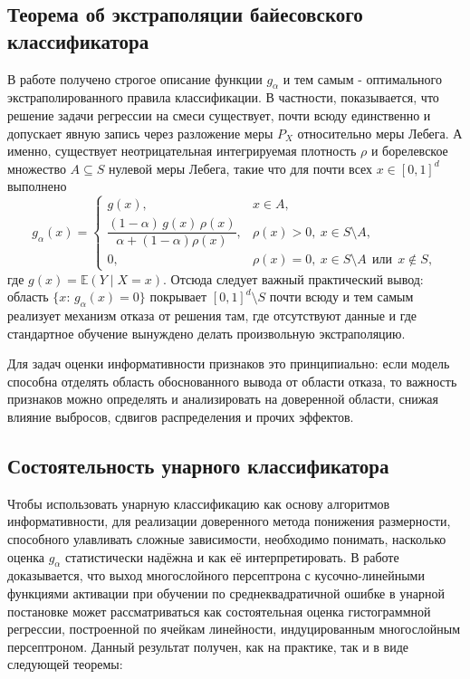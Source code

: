 \documentclass[12pt,a4paper]{article}
\begin{document}
\subsection{Теорема об экстраполяции байесовского классификатора}

В работе \cite{unar} получено строгое описание функции $g_\alpha$ и тем самым - оптимального
экстраполированного правила классификации. В частности, показывается, что решение задачи
регрессии на смеси существует, почти всюду единственно и допускает явную запись через
разложение меры $P_X$ относительно меры Лебега.
А именно, существует неотрицательная интегрируемая плотность $\rho$ и борелевское множество
$A\subseteq S$ нулевой меры Лебега, такие что для почти всех $x\in[0,1]^d$ выполнено
\begin{equation}
g_\alpha(x)=
\begin{cases}
g(x), & x\in A,\\[2mm]
\dfrac{(1-\alpha)\,g(x)\,\rho(x)}{\alpha+(1-\alpha)\rho(x)}, & \rho(x)>0,\ x\in S\setminus A,\\[3mm]
0, & \rho(x)=0,\ x\in S\setminus A\ \ \text{или}\ \ x\notin S,
\end{cases}
\end{equation}
где $g(x)=\mathbb{E}(Y\mid X=x)$.
Отсюда следует важный практический вывод: область $\{x:\,g_\alpha(x)=0\}$ покрывает
$[0,1]^d\setminus S$ почти всюду и тем самым реализует механизм отказа от решения там,
где отсутствуют данные и где стандартное обучение вынуждено делать
произвольную экстраполяцию.

Для задач оценки информативности признаков это принципиально: если модель способна
отделять область обоснованного вывода от области отказа, то важность признаков можно
определять и анализировать на доверенной области, снижая влияние выбросов,
сдвигов распределения и прочих эффектов.

\subsection{Состоятельность унарного классификатора}

Чтобы использовать унарную классификацию как основу алгоритмов информативности, для реализации доверенного метода
понижения размерности, способного улавливать сложные зависимости, необходимо понимать, 
насколько оценка $g_\alpha$ статистически надёжна и как её интерпретировать. В работе
\cite{eliseev2025} доказывается, что выход многослойного персептрона с кусочно-линейными функциями активации при обучении по
среднеквадратичной ошибке в унарной постановке может рассматриваться как состоятельная оценка гистограммной
регрессии, построенной по ячейкам линейности, индуцированным многослойным персептроном. Данный результат получен, как на практике, так и в виде следующей теоремы:
\end{document}
